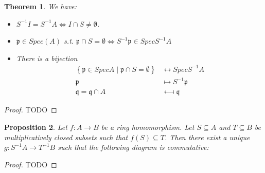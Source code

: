 \documentclass[11pt]{article}
\newtheorem{theorem}{Theorem}[section]
\newtheorem{prop}[theorem]{Proposition}
\theoremstyle{definition}
\begin{document}
        \begin{theorem}
            We have:
            \begin{itemize}
                \item $S^{-1}I = S^{-1}A \Leftrightarrow I \cap S \neq \emptyset$.
                \item $\mathfrak{p} \in Spec(A)$ s.t. $\mathfrak{p} \cap S = \emptyset \Leftrightarrow S^{-1}\mathfrak{p} \in SpecS^{-1}A$
                \item There is a bijection
                \[
                    \begin{aligned}
                        \left\{ \mathfrak{p} \in SpecA \mid \mathfrak{p} \cap S = \emptyset \right\} &\longleftrightarrow SpecS^{-1}A \\
                        \mathfrak{p} &\longmapsto S^{-1}\mathfrak{p} \\
                        \mathfrak{q} = \mathfrak{q} \cap A &\longmapsfrom \mathfrak{q}
                    \end{aligned}
                \]
            \end{itemize}
        \end{theorem}
            \begin{proof}

                TODO

            \end{proof}

        \begin{prop}
            Let $f:A \longrightarrow B$ be a ring homomorphism.
            Let $S \subseteq A$ and $T \subseteq B$ be multiplicatively closed subsets such that $f(S) \subseteq T$.
            Then there exist a unique $g: S^{-1}A \longrightarrow T^{-1}B$ such that the following diagram is commutative:
            \begin{center}
            \end{center}
        \end{prop}
            \begin{proof}

                TODO

            \end{proof}
\end{document}
